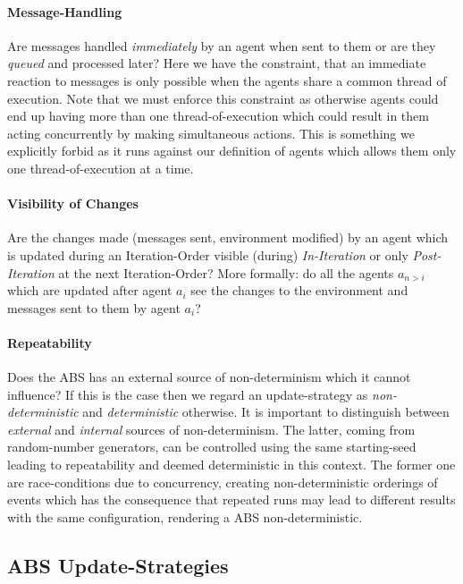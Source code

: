 \paragraph{Message-Handling}
Are messages handled \textit{immediately} by an agent when sent to them or are they \textit{queued} and processed later? Here we have the constraint, that an immediate reaction to messages is only possible when the agents share a common thread of execution. Note that we must enforce this constraint as otherwise agents could end up having more than one thread-of-execution which could result in them acting concurrently by making simultaneous actions. This is something we explicitly forbid as it runs against our definition of agents which allows them only one thread-of-execution at a time.

\paragraph{Visibility of Changes}
Are the changes made (messages sent, environment modified) by an agent which is updated during an Iteration-Order visible (during) \textit{In-Iteration} or only \textit{Post-Iteration} at the next Iteration-Order? More formally: do all the agents $a_{n>i}$ which are updated after agent $a_i$ see the changes to the environment and messages sent to them by agent $a_i$?

\paragraph{Repeatability}
Does the ABS has an external source of non-determinism which it cannot influence? If this is the case then we regard an update-strategy as \textit{non-deterministic} and \textit{deterministic} otherwise. It is important to distinguish between \textit{external} and \textit{internal} sources of non-determinism. The latter, coming from random-number generators, can be controlled using the same starting-seed leading to repeatability and deemed deterministic in this context. The former one are race-conditions due to concurrency, creating non-deterministic orderings of events which has the consequence that repeated runs may lead to different results with the same configuration, rendering a ABS non-deterministic.

\subsection{ABS Update-Strategies}


